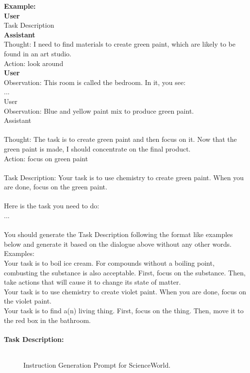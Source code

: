 \begin{tcolorbox}[breakable,title=Instruction Generation Prompt for ScienceWorld]
\textcolor{my_green!50}{\textbf{Example:} }\\
\textcolor{my_purple}{
\textbf{User} \\
Task Description \\
\textbf{Assistant} \\
}
\textcolor{my_purple}{
Thought: I need to find materials to create green paint, which are likely to be found in an art studio. \\
Action: look around \\
\textbf{User} \\
Observation: This room is called the bedroom. In it, you see:  \\
... \\
User \\
Observation: Blue and yellow paint mix to produce green paint. \\
Assistant \\
\\
Thought: The task is to create green paint and then focus on it. Now that the green paint is made, I should concentrate on the final product. \\
Action: focus on green paint \\
\\
Task Description: Your task is to use chemistry to create green paint. When you are done, focus on the green paint.\\
}\\
\textcolor{my_blue!50}{Here is the task you need to do:\\
... \\
\\
You should generate the Task Description following the format like examples below and generate it based on the dialogue above without any other words.\\
Examples:\\
Your task is to boil ice cream. For compounds without a boiling point, combusting the substance is also acceptable. First, focus on the substance. Then, take actions that will cause it to change its state of matter.\\
Your task is to use chemistry to create violet paint. When you are done, focus on the violet paint.\\
Your task is to find a(n) living thing. First, focus on the thing. Then, move it to the red box in the bathroom.\\
\\
\textbf{Task Description:} \\
}\\
\end{tcolorbox}
\begin{figure}[!htp]
    \centering
    \vspace{-8pt}
    \caption{
    Instruction Generation Prompt for ScienceWorld.
    }
    \label{fig:instruction_generation_sciworld}
\end{figure}

